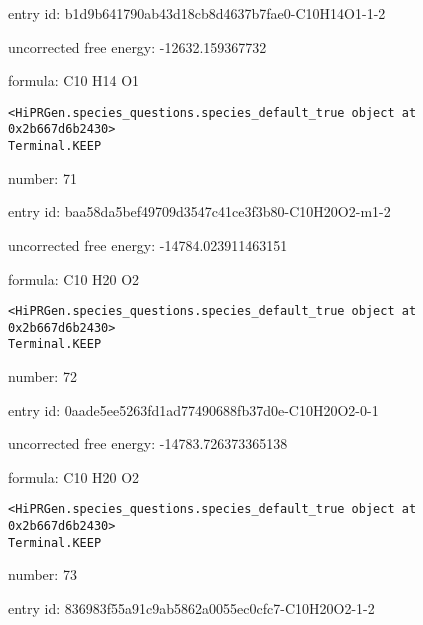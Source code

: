 \documentclass{article}
\begin{document}
entry id: b1d9b641790ab43d18cb8d4637b7fae0-C10H14O1-1-2



uncorrected free energy: -12632.159367732



formula: C10 H14 O1


\vspace{1cm}
\begin{verbatim}
<HiPRGen.species_questions.species_default_true object at 0x2b667d6b2430>
Terminal.KEEP
\end{verbatim}


number: 71



entry id: baa58da5bef49709d3547c41ce3f3b80-C10H20O2-m1-2



uncorrected free energy: -14784.023911463151



formula: C10 H20 O2


\vspace{1cm}
\begin{verbatim}
<HiPRGen.species_questions.species_default_true object at 0x2b667d6b2430>
Terminal.KEEP
\end{verbatim}


number: 72



entry id: 0aade5ee5263fd1ad77490688fb37d0e-C10H20O2-0-1



uncorrected free energy: -14783.726373365138



formula: C10 H20 O2


\vspace{1cm}
\begin{verbatim}
<HiPRGen.species_questions.species_default_true object at 0x2b667d6b2430>
Terminal.KEEP
\end{verbatim}


number: 73



entry id: 836983f55a91c9ab5862a0055ec0cfc7-C10H20O2-1-2
\end{document}
